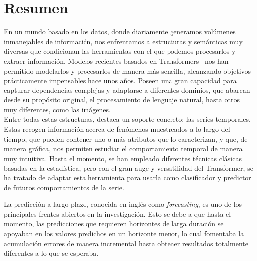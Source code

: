 %

\chapter{Resumen}

En un mundo basado en los datos, donde diariamente generamos volúmenes inmanejables de información, nos enfrentamos a estructuras y semánticas muy diversas que condicionan las herramientas con el que podemos procesarlos y extraer información. Modelos recientes basados en Transformers~\cite{vaswani2023attentionneed} nos han permitido modelarlos y procesarlos de manera más sencilla, alcanzando objetivos prácticamente impensables hace unos años. Poseen una gran capacidad para capturar dependencias complejas y adaptarse a diferentes dominios, que abarcan desde su propósito original, el procesamiento de lenguaje natural, hasta otros muy diferentes, como las imágenes.\\
Entre todas estas estructuras, destaca un soporte concreto: las series temporales. Estas recogen información acerca de fenómenos muestreados a lo largo del tiempo, que pueden contener uno o más atributos que lo caracterizan, y que, de manera gráfica, nos permiten estudiar el comportamiento temporal de manera muy intuitiva. Hasta el momento, se han empleado diferentes técnicas clásicas basadas en la estadística, pero con el gran auge y versatilidad del Transformer, se ha tratado de adaptar esta herramienta para usarla como clasificador y predictor de futuros comportamientos de la serie.\vspace{0.35em}

La predicción a largo plazo, conocida en inglés como \textit{forecasting}, es uno de los principales frentes abiertos en la investigación. Esto se debe a que hasta el momento, las predicciones que requieren horizontes de larga duración se apoyaban en los valores predichos en un horizonte menor, lo cual fomentaba la acumulación errores de manera incremental hasta obtener resultados totalmente diferentes a lo que se esperaba. \vspace{0.35em}

